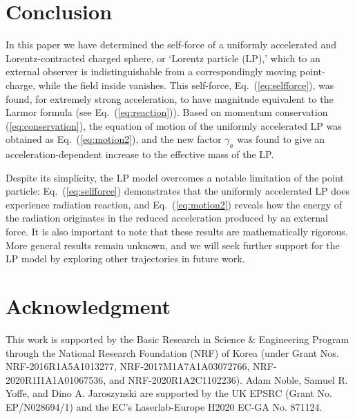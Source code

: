 \documentclass[a4paper,fleqn]{cas-sc}
\begin{document}
\section{Conclusion}

In this paper we have determined the self-force of a uniformly accelerated and Lorentz-contracted charged sphere, or `Lorentz particle (LP),' which to an external observer is indistinguishable from a correspondingly moving point-charge, while the field inside vanishes. This self-force, Eq.~(\ref{eq:selfforce}), was found, for extremely strong acceleration, to have magnitude equivalent to the Larmor formula  (see Eq.~(\ref{eq:reaction})). Based on momentum conservation (\ref{eq:conservation}), the equation of motion of the uniformly accelerated LP was obtained as Eq.~(\ref{eq:motion2}), and the new factor $\gamma_{a}$ was found to give an acceleration-dependent increase to the effective mass of the LP.

Despite its simplicity, the LP model overcomes a notable limitation of the point particle: Eq.~(\ref{eq:selfforce}) demonstrates that the uniformly accelerated LP does experience radiation reaction, and Eq.~(\ref{eq:motion2}) reveals how the energy of the radiation originates in the reduced acceleration produced by an external force. It is also important to note that these results are mathematically rigorous. More general results remain unknown, and we will seek further support for the LP model by exploring other trajectories in future work.

\section*{Acknowledgment}

This work is supported by the Basic Research in Science \& Engineering Program through the National Research Foundation (NRF) of Korea (under Grant Nos. NRF-2016R1A5A1013277, NRF-2017M1A7A1A03072766, NRF-2020R1I1A1A01067536, and NRF-2020R1A2C1102236). Adam Noble, Samuel R. Yoffe, and Dino A. Jaroszynski are supported by the UK EPSRC (Grant No. EP/N028694/1) and the EC's Laserlab-Europe H2020 EC-GA No. 871124.


%
%

%
\end{document}
